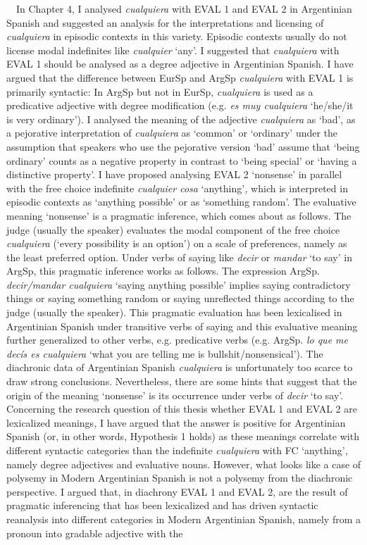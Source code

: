 \documentclass[10pt]{article}
\newenvironment{styleStandard}{\renewcommand\baselinestretch{1.25}\setlength\leftskip{0cm}\setlength\rightskip{0cm}\setlength\parindent{0cm}\setlength\parfillskip{0pt plus 1fil}\setlength\parskip{0in plus 1pt}\writerlistparindent\writerlistleftskip\leavevmode\normalfont\normalsize\fontsize{12pt}{14.4pt}\selectfont\writerlistlabel\ignorespaces}{\unskip\vspace{0in plus 1pt}\par}
\newcommand\writerlistleftskip{}
\newcommand\writerlistparindent{}
\newcommand\writerlistlabel{}
\begin{document}
\begin{styleStandard}
\ \ In Chapter 4, I analysed \textit{cualquiera} with EVAL 1 and EVAL 2 in Argentinian Spanish and suggested an analysis for the interpretations and licensing of \textit{cualquiera} in episodic contexts in this variety. Episodic contexts usually do not license modal indefinites like \textit{cualquier} ‘any’. I suggested that \textit{cualquiera} with EVAL 1 should be analysed as a degree adjective in Argentinian Spanish. I have argued that the difference between EurSp and ArgSp \textit{cualquiera} with EVAL 1 is primarily syntactic: In ArgSp but not in EurSp, \textit{cualquiera} is used as a predicative adjective with degree modification (e.g. \textit{es muy cualquiera} ‘he/she/it is very ordinary’). I analysed the meaning of the adjective \textit{cualquiera} as ‘bad’, as a pejorative interpretation of \textit{cualquiera} as ‘common’ or ‘ordinary’ under the assumption that speakers who use the pejorative version ‘bad’ assume that ‘being ordinary’ counts as a negative property in contrast to ‘being special’ or ‘having a distinctive property’. I have proposed analysing EVAL 2 ‘nonsense’ in parallel with the free choice indefinite\textit{ cualquier cosa }‘anything’\textit{, }which is interpreted in episodic contexts as ‘anything possible’ or as ‘something random’. The evaluative meaning ‘nonsense’ is a pragmatic inference, which comes about as follows. The judge (usually the speaker) evaluates the modal component of the free choice \textit{cualquiera} (‘every possibility is an option’) on a scale of preferences, namely as the least preferred option. Under verbs of saying like \textit{decir} or \textit{mandar} ‘to say’ in ArgSp, this pragmatic inference works as follows. The expression ArgSp. \textit{decir/mandar cualquiera} ‘saying anything possible’ implies saying contradictory things or saying something random or saying unreflected things according to the judge (usually the speaker). This pragmatic evaluation has been lexicalised in Argentinian Spanish under transitive verbs of saying and this evaluative meaning further generalized to other verbs, e.g. predicative verbs (e.g. ArgSp. \textit{lo que me decís es cualquiera} ‘what you are telling me is bullshit/nonsensical’). The diachronic data of Argentinian Spanish \textit{cualquiera} is unfortunately too scarce to draw strong conclusions. Nevertheless, there are some hints that suggest that the origin of the meaning ‘nonsense’ is its occurrence under verbs of \textit{decir} ‘to say’. Concerning the research question of this thesis whether EVAL 1 and EVAL 2 are lexicalized meanings\textit{, }I have argued that the answer is positive for Argentinian Spanish (or, in other words, Hypothesis 1 holds) as these meanings correlate with different syntactic categories than the indefinite \textit{cualquiera} with FC ‘anything’, namely degree adjectives and evaluative nouns. However, what looks like a case of polysemy in Modern Argentinian Spanish is not a polysemy from the diachronic perspective. I argued that, in diachrony EVAL 1 and EVAL 2, are the result of pragmatic inferencing that has been lexicalized and has driven syntactic reanalysis into different categories in Modern Argentinian Spanish, namely from a pronoun into gradable adjective with the 
\end{styleStandard}
\end{document}

